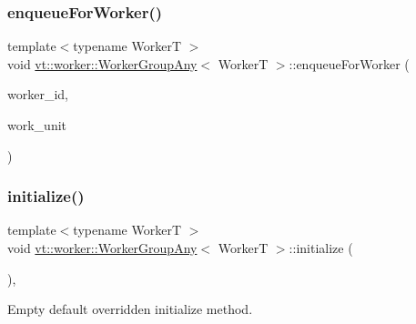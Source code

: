 \mbox{\label{structvt_1_1worker_1_1_worker_group_any_a7f800682c86f876c626d3ee1b9735680}} 
\subsubsection{\texorpdfstring{enqueue\+For\+Worker()}{enqueueForWorker()}}
{\footnotesize\ttfamily template$<$typename WorkerT $>$ \\
void \hyperlink{structvt_1_1worker_1_1_worker_group_any}{vt\+::worker\+::\+Worker\+Group\+Any}$<$ WorkerT $>$\+::enqueue\+For\+Worker (\begin{DoxyParamCaption}\item[{\hyperlink{namespacevt_a656e362091da17b9b93d0655b36e3392}{Worker\+I\+D\+Type} const \&}]{worker\+\_\+id,  }\item[{\hyperlink{namespacevt_1_1worker_a59d2fcdafa81fc0af7f921a258e42202}{Work\+Unit\+Type} const \&}]{work\+\_\+unit }\end{DoxyParamCaption})}

\mbox{\label{structvt_1_1worker_1_1_worker_group_any_ad8bb855b98bf26337ca13df2bff5fb95}} 
\subsubsection{\texorpdfstring{initialize()}{initialize()}}
{\footnotesize\ttfamily template$<$typename WorkerT $>$ \\
void \hyperlink{structvt_1_1worker_1_1_worker_group_any}{vt\+::worker\+::\+Worker\+Group\+Any}$<$ WorkerT $>$\+::initialize (\begin{DoxyParamCaption}{ }\end{DoxyParamCaption})\hspace{0.3cm}{\ttfamily [override]}, {\ttfamily [virtual]}}



Empty default overridden initialize method. 




